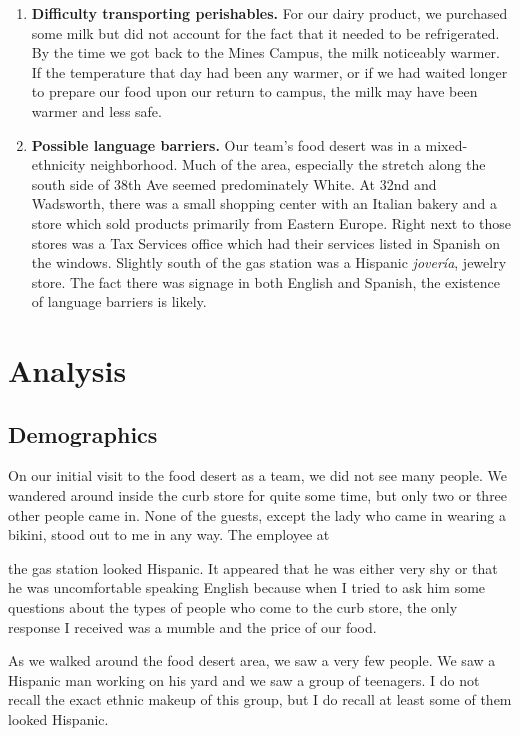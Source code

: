 \documentclass[11pt]{article}
\begin{document}
\begin{enumerate}
    \item \textbf{Difficulty transporting perishables.} For our dairy product, we purchased some
        milk but did not account for the fact that it needed to be refrigerated. By the time we got
        back to the Mines Campus, the milk noticeably warmer. If the temperature that day had been
        any warmer, or if we had waited longer to prepare our food upon our return to campus, the
        milk may have been warmer and less safe.

    \item \textbf{Possible language barriers.} Our team's food desert was in a mixed-ethnicity
        neighborhood. Much of the area, especially the stretch along the south side of 38th Ave
        seemed predominately White. At 32nd and Wadsworth, there was a small shopping center with an
        Italian bakery and a store which sold products primarily from Eastern Europe. Right next to
        those stores was a Tax Services office which had their services listed in Spanish on the
        windows. Slightly south of the gas station was a Hispanic \textit{jover\'{i}a}, jewelry
        store. The fact there was signage in both English and Spanish, the existence of language
        barriers is likely.
\end{enumerate}

\section{Analysis}
\subsection{Demographics}
On our initial visit to the food desert as a team, we did not see many people. We wandered around
inside the curb store for quite some time, but only two or three other people came in. None of the
guests, except the lady who came in wearing a bikini, stood out to me in any way. The employee at

the gas station looked Hispanic. It appeared that he was either very shy or that he was
uncomfortable speaking English because when I tried to ask him some questions about the types of
people who come to the curb store, the only response I received was a mumble and the price of our
food.

As we walked around the food desert area, we saw a very few people. We saw a Hispanic man working on
his yard and we saw a group of teenagers. I do not recall the exact ethnic makeup of this group, but
I do recall at least some of them looked Hispanic.
\end{document}
